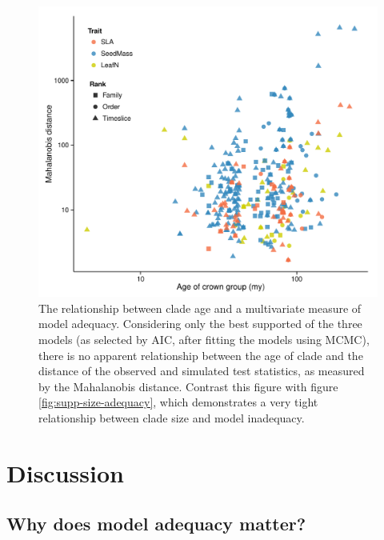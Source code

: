 \begin{figure}[p]
  \centering
  \includegraphics[width=\textwidth]{figs/ad-age-bayes}
  \caption[Model adequacy versus model support (Bayesian)]{The relationship between clade age and a multivariate measure of model adequacy. Considering only the best supported of the three models (as selected by AIC, after fitting the models using MCMC), there is no  apparent relationship between the age of clade and the distance of the observed and simulated test statistics, as measured by the Mahalanobis distance. Contrast this figure with figure \ref{fig:supp-size-adequacy}, which demonstrates a very tight relationship between clade size and model inadequacy.}
  \label{fig:supp-age-bayes}
\end{figure}

\section{Discussion}

\subsection{Why does model adequacy matter?}

